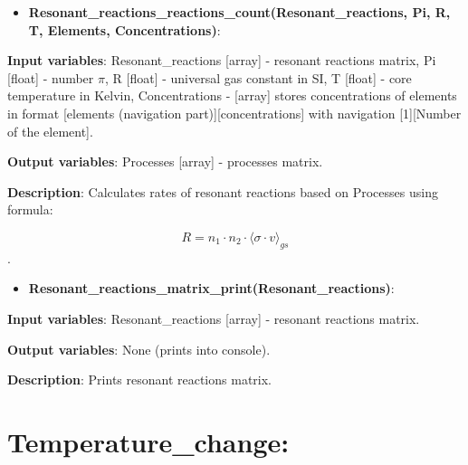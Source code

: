 \documentclass[a4paper,12pt]{article}
\newcommand{\namefunction}[4]{
  \begin{itemize}
    \item \textbf{#1}:
  \end{itemize}
  
  \textbf{Input variables}: #2.
  
  \textbf{Output variables}: #4.
  
  \textbf{Description}: #3.
}
\begin{document}
\vspace{1em}

\namefunction{Resonant\_reactions\_reactions\_count(Resonant\_reactions, Pi, R, T, Elements, Concentrations)}{Resonant\_reactions [array] - resonant reactions matrix, Pi [float] - number $\pi$, R [float] - universal gas constant in SI, T [float] - core temperature in Kelvin, Concentrations - [array] stores concentrations of elements in format [elements (navigation part)][concentrations] with navigation [1][Number of the element]}{Calculates rates of resonant reactions based on Processes using formula:

\[R = n_1 \cdot n_2 \cdot \langle \sigma \cdot v \rangle_{gs}\]}{Processes [array] - processes matrix}

\vspace{1em}

\namefunction{Resonant\_reactions\_matrix\_print(Resonant\_reactions)}{Resonant\_reactions [array] - resonant reactions matrix}{Prints resonant reactions matrix}{None (prints into console)}

\section{Temperature\_change:}

\vspace{1em}
\end{document}
